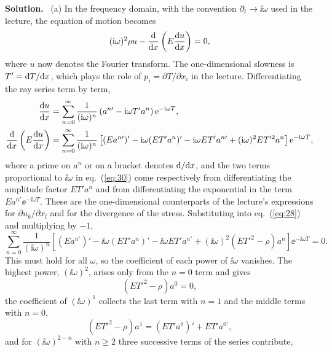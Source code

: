 \documentclass[a4paper,12pt]{paper}
\newenvironment{solution}{\par\noindent\textbf{Solution.}\ }{\par\medskip}
\begin{document}
\begin{solution}
(a) In the frequency domain, with the convention $\partial_{t}\to\ii\omega$ used in the lecture,
the equation of motion becomes
\begin{equation}
(\mathrm{i}\omega)^{2}\rho u-\frac{\mathrm{d}}{\mathrm{d} x}\left(E\frac{\mathrm{d} u}{\mathrm{d} x}\right)=0,
\label{eq:28}
\end{equation}
where $u$ now denotes the Fourier transform. The one-dimensional slowness is
$T'=\mathrm{d} T/\mathrm{d} x$, which plays the role of $p_{i}=\partial T/\partial x_{i}$ in the lecture.
Differentiating the ray series term by term,
\begin{align}
\frac{\mathrm{d} u}{\mathrm{d} x}&=\sum_{n=0}^{\infty}\frac{1}{(\mathrm{i}\omega)^{n}}\left(a^{n\prime}-\mathrm{i}\omega T'a^{n}\right)\mathrm{e}^{-\mathrm{i}\omega T},\label{eq:29}\\
\frac{\mathrm{d}}{\mathrm{d} x}\left(E\frac{\mathrm{d} u}{\mathrm{d} x}\right)&=\sum_{n=0}^{\infty}\frac{1}{(\mathrm{i}\omega)^{n}}\left[(Ea^{n\prime})'-\mathrm{i}\omega(ET'a^{n})'-\mathrm{i}\omega ET'a^{n\prime}+(\mathrm{i}\omega)^{2}ET'^{2}a^{n}\right]\mathrm{e}^{-\mathrm{i}\omega T},\label{eq:30}
\end{align}
where a prime on $a^{n}$ or on a bracket denotes $\mathrm{d}/\mathrm{d} x$, and the two terms proportional to
$\ii\omega$ in eq.~(\ref{eq:30}) come respectively from differentiating the amplitude factor
$ET'a^{n}$ and from differentiating the exponential in the term $Ea^{n\prime}\ee^{-\ii\omega T}$.
These are the one-dimensional counterparts of the lecture's expressions for
$\partial u_{k}/\partial x_{l}$ and for the divergence of the stress. Substituting into
eq.~(\ref{eq:28}) and multiplying by $-1$,
\begin{equation}
\sum_{n=0}^{\infty}\frac{1}{(\ii\omega)^{n}}\left[(Ea^{n\prime})'-\ii\omega(ET'a^{n})'-\ii\omega ET'a^{n\prime}
+(\ii\omega)^{2}\left(ET'^{2}-\rho\right)a^{n}\right]\ee^{-\ii\omega T}=0.
\label{eq:31}
\end{equation}
This must hold for all $\omega$, so the coefficient of each power of $\ii\omega$ vanishes. The
highest power, $(\ii\omega)^{2}$, arises only from the $n=0$ term and gives
\begin{equation}
\left(ET'^{2}-\rho\right)a^{0}=0,
\label{eq:32}
\end{equation}
the coefficient of $(\ii\omega)^{1}$ collects the last term with $n=1$ and the middle terms with $n=0$,
\begin{equation}
\left(ET'^{2}-\rho\right)a^{1}=(ET'a^{0})'+ET'a^{0\prime},
\label{eq:33}
\end{equation}
and for $(\ii\omega)^{2-n}$ with $n\ge2$ three successive terms of the series contribute,

\end{solution}
\end{document}
